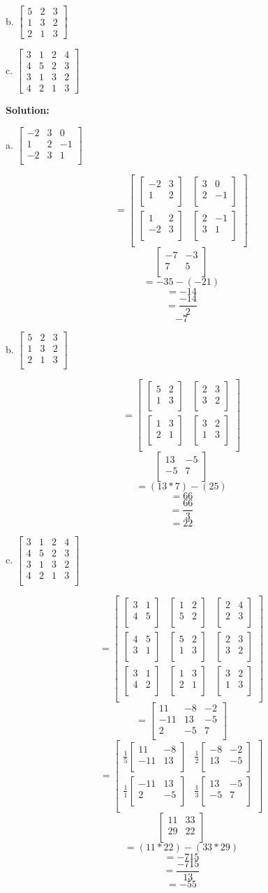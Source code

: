 \documentclass[12pt]{article}
\newcommand{\sol} {\textbf{Solution:}}
\newcommand{\matxx}[2] {
\begin{bmatrix}
  #1 \\
  #2 \\
\end{bmatrix}
}
\newcommand{\matxxx}[3] {
\begin{bmatrix}
  #1 \\
  #2 \\
  #3 \\
\end{bmatrix}
}
\newcommand{\matxxxx}[4] {
\begin{bmatrix}
  #1 \\
  #2 \\
  #3 \\
  #4 \\
\end{bmatrix}
}
\begin{document}
b. $%
\begin{bmatrix}
5 & 2 & 3\\
1 & 3 & 2\\
2 & 1 & 3
\end{bmatrix}
$

c. $%
\begin{bmatrix}
3 & 1 & 2 & 4\\
4 & 5 & 2 & 3\\
3 & 1 & 3 & 2\\
4 & 2 & 1 & 3
\end{bmatrix}
$

\bigskip
\sol

\bigskip

a. 
\(
\matxxx{-2&3&0}
		{1&2&-1}
		{-2&3&1}
\)

\[
=
\matxx
	{\matxx{-2&3}{1&2} & \matxx{3&0}{2&-1}}
    {\matxx{1&2}{-2&3} & \matxx{2&-1}{3&1}} 
\]
\[
\matxx{-7 & -3}
		{7 & 5}
\]
\[
=-35 - (-21)
\]
\[=-14\]
\[=\frac{-14}{2}\]
\[-7\]

b. 
\(
\matxxx{5&2&3}
		{1&3&2}
		{2&1&3}
\)

\[
=
\matxx
	{\matxx{5&2}{1&3} & \matxx{2&3}{3&2}}
    {\matxx{1&3}{2&1} & \matxx{3&2}{1&3}} 
\]
\[
\matxx{13 & -5}
		{-5 & 7}
\]
\[
=(13 * 7) - (25)
\]
\[=66\]
\[=\frac{66}{3}\]
\[=22\]

c. 
\(
\matxxxx{3&1&2&4}
		{4&5&2&3}
		{3&1&3&2}
        {4&2&1&3}
\)

\[
=
\matxxx
	{\matxx{3&1}{4&5} & \matxx{1&2}{5&2} & \matxx{2&4}{2&3}}
    {\matxx{4&5}{3&1} & \matxx{5&2}{1&3} & \matxx{2&3}{3&2}}
    {\matxx{3&1}{4&2} & \matxx{1&3}{2&1} & \matxx{3&2}{1&3}}
\]
\[
=
\matxxx
	{11 & -8 & -2}
    {-11 & 13 & -5}
    {2 & -5 & 7}
\]
\[
=
\matxx
	{\frac{1}{5}\matxx{11&-8}{-11&13} & \frac{1}{2}\matxx{-8&-2}{13&-5}}
    {\frac{1}{1}\matxx{-11&13}{2&-5} & \frac{1}{3}\matxx{13&-5}{-5&7}} \]
\[
\matxx{11 & 33}{29 & 22}
\]
\[
=(11*22) - (33 * 29)
\]
\[
= - 715
\]
\[=\frac{-715}{13}\]
\[=-55\]
\end{document}
